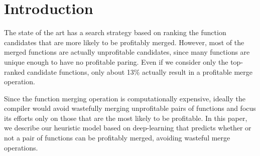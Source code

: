 \section{Introduction}
\label{sec:introduction}

The state of the art has a search strategy based on ranking the function candidates that are more likely to be profitably merged.
However, most of the merged functions are actually unprofitable candidates, since many functions are unique enough to have no profitable paring.
Even if we consider only the top-ranked candidate functions, only about 13\% actually result in a profitable merge operation.

Since the function merging operation is computationally expensive, ideally the compiler would avoid wastefully merging unprofitable pairs of functions and focus its efforts only on those that are the most likely to be profitable.
In this paper, we describe our heuristic model based on deep-learning that predicts whether or not a pair of functions can be profitably merged, avoiding wasteful merge operations.


